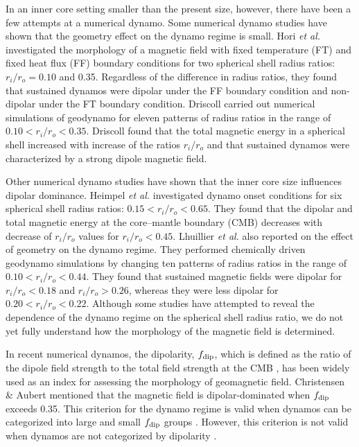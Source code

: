 {\color{red} %
In an inner core setting smaller than the present size, however, there have been a few attempts at a numerical dynamo. 
}
Some numerical dynamo studies have shown that the geometry effect on the dynamo regime is small. 
Hori {\it et al.}  investigated the morphology of a magnetic field with fixed temperature (FT) and fixed heat flux (FF) boundary conditions for two spherical shell radius ratios: $r_{i} / r_{o} = 0.10$ and 0.35. 
Regardless of the difference in radius ratios, they found that sustained dynamos were dipolar under the FF boundary condition and non-dipolar under the FT boundary condition. 
Driscoll  carried out numerical simulations of geodynamo for eleven patterns of radius ratios in the range of $0.10 < r_{i} / r_{o} < 0.35$.%
Driscoll  found that the total magnetic energy in a spherical shell increased with increase of the ratios $r_{i} / r_{o}$ and that sustained dynamos were characterized by a strong dipole magnetic field.

Other numerical dynamo studies have shown that the inner core size influences dipolar dominance. Heimpel {\it et al.}  investigated dynamo onset conditions for six spherical shell radius ratios: $0.15 < r_{i} / r_{o} < 0.65$. 
They found that the dipolar and total magnetic energy at the core–mantle boundary (CMB) decreases with decrease of $r_{i} / r_{o}$ values for $r_{i} / r_{o} < 0.45$. 
Lhuillier {\it et al.}  also reported on the effect of geometry on the dynamo regime. 
They performed chemically driven geodynamo simulations by changing ten patterns of radius ratios in the range of $0.10 < r_{i} / r_{o} < 0.44$. 
They found that sustained magnetic fields were dipolar for  $r_{i} / r_{o} < 0.18$ and  $r_{i} / r_{o} > 0.26$, whereas they were less dipolar for $0.20 < r_{i} / r_{o} < 0.22$. 
Although some studies have attempted to reveal the dependence of the dynamo regime on the spherical shell radius ratio, we do not yet fully understand how the morphology of the magnetic field is determined.

In recent numerical dynamos, the dipolarity, $f_{\rm dip}$, which is defined as the ratio of the dipole field strength to the total field strength at the CMB \cite{Uli:2006}, has been widely used as an index for assessing the morphology of geomagnetic field. 
Christensen \& Aubert  mentioned that the magnetic field is dipolar-dominated when $f_{\rm dip}$ exceeds 0.35. 
This criterion for the dynamo regime is valid when dynamos can be categorized into large and small $f_{\rm dip}$ groups \cite{Soderlund:2012}. However, this criterion is not valid when dynamos are not categorized by dipolarity \cite{Aubert:2009}. 

